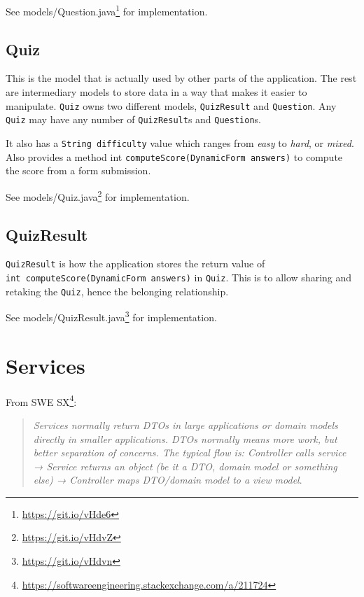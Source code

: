 \documentclass[english,a4paper,]{report}
\renewcommand{\href}[2]{#2\footnote{\url{#1}}}
\begin{document}
See \href{https://git.io/vHde6}{models/Question.java} for
implementation.

\hypertarget{quiz}{\subsection{Quiz}\label{quiz}}

This is the model that is actually used by other parts of the
application. The rest are intermediary models to store data in a way
that makes it easier to manipulate. \texttt{Quiz} owns two different
models, \texttt{QuizResult} and \texttt{Question}. Any \texttt{Quiz} may
have any number of \texttt{QuizResult}s and \texttt{Question}s.

It also has a \texttt{String\ difficulty} value which ranges from
\emph{easy} to \emph{hard}, or \emph{mixed}. Also provides a method int
\texttt{computeScore(DynamicForm\ answers)} to compute the score from a
form submission.

See \href{https://git.io/vHdvZ}{models/Quiz.java} for implementation.

\subsection{QuizResult}\label{quizresult}

\texttt{QuizResult} is how the application stores the return value of
\texttt{int\ computeScore(DynamicForm\ answers)} in \texttt{Quiz}. This
is to allow sharing and retaking the \texttt{Quiz}, hence the belonging
relationship.

See \href{https://git.io/vHdvn}{models/QuizResult.java} for
implementation.

\section{Services}\label{services}

From \href{https://softwareengineering.stackexchange.com/a/211724}{SWE
SX}:

\begin{quote}
\emph{Services normally return DTOs in large applications or domain
models directly in smaller applications. DTOs normally means more work,
but better separation of concerns. The typical flow is: Controller calls
service → Service returns an object (be it a DTO, domain model or
something else) → Controller maps DTO/domain model to a view model}.
\end{quote}
\end{document}
